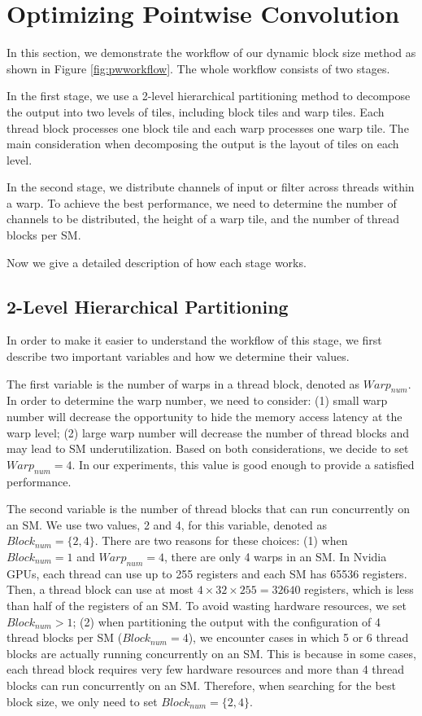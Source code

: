 \section{Optimizing Pointwise Convolution}
\label{sec:pwconv}
In this section, we demonstrate the workflow of our dynamic block size method as shown in Figure \ref{fig:pwworkflow}. 
The whole workflow consists of two stages. 

In the first stage, we use a 2-level hierarchical partitioning method to decompose the output into two levels of tiles, including block tiles and warp tiles. 
Each thread block processes one block tile and each warp processes one warp tile. 
The main consideration when decomposing the output is the layout of tiles on each level.

In the second stage, we distribute channels of input or filter across threads within a warp.
To achieve the best performance, we need to determine the number of channels to be distributed, the height of a warp tile, and the number of thread blocks per SM.

Now we give a detailed description of how each stage works.
\subsection{2-Level Hierarchical Partitioning}
In order to make it easier to understand the workflow of this stage, we first describe two important variables and how we determine their values.

The first variable is the number of warps in a thread block, denoted as $Warp_{num}$.
In order to determine the warp number, we need to consider: (1) small warp number will decrease the opportunity to hide the memory access latency at the warp level;
(2) large warp number will decrease the number of thread blocks and may lead to SM underutilization.
Based on both considerations, we decide to set $Warp_{num}=4$.
In our experiments, this value is good enough to provide a satisfied performance.

The second variable is the number of thread blocks that can run concurrently on an SM.
We use two values, 2 and 4, for this variable, denoted as $Block_{num}=\{2, 4\}$. 
There are two reasons for these choices: 
(1) when $Block_{num}=1$ and $Warp_{num}=4$, there are only 4 warps in an SM. 
In Nvidia GPUs, each thread can use up to 255 registers and each SM has 65536 registers. 
Then, a thread block can use at most $4 \times 32 \times 255=32640$ registers, which is less than half of the registers of an SM.
To avoid wasting hardware resources, we set $Block_{num}>1$; 
(2) when partitioning the output with the configuration of 4 thread blocks per SM ($Block_{num}=4$), we encounter cases in which 5 or 6 thread blocks are actually running concurrently on an SM. 
This is because in some cases, each thread block requires very few hardware resources and more than 4 thread blocks can run concurrently on an SM.
Therefore, when searching for the best block size, we only need to set $Block_{num}=\{2,4\}$.

